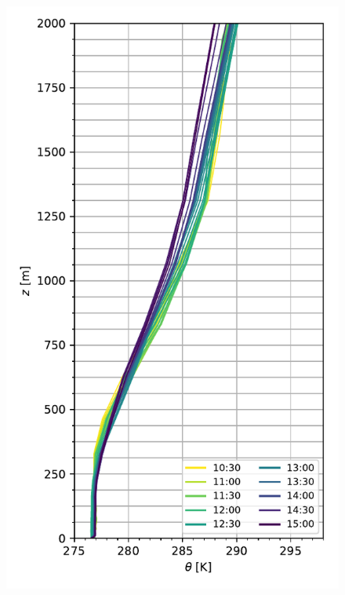 \begin{figure}[H]
	\begin{minipage}{0.5\linewidth}
	\end{minipage}%
	\begin{minipage}{0.5\linewidth}
	\end{minipage}%
	
	\begin{minipage}{0.5\linewidth}
		\centering
		\includegraphics[width=0.9\linewidth,trim={0cm 5mm 0cm 0mm},clip]{Imagenes/06/bol_da/mean_pbl}%
	\end{minipage}%

\end{figure}

